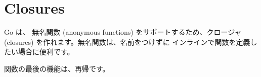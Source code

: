 \section{Closures}

Go は、 無名関数 (anonymous functions) をサポートするため、クロージャ (closures) を作れます。無名関数は、名前をつけずに インラインで関数を定義したい場合に便利です。




関数の最後の機能は、再帰です。